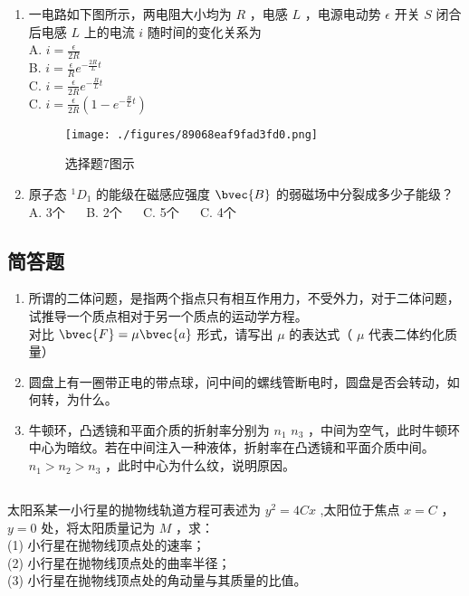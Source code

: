 \begin{enumerate}
\item 一电路如下图所示，两电阻大小均为 $R$ ，电感 $L$ ，电源电动势 $\epsilon$ 开关 $S$ 闭合后电感 $L$ 上的电流 $i$ 随时间的变化关系为\\

A. $i = \frac{\epsilon}{2R}$\\
B. $i = \frac{\epsilon}{R}e^{-\frac{2R}{L}t}$\\
C. $i = \frac{\epsilon}{2R}e^{-\frac{R}{L}t}$\\
C. $i = \frac{\epsilon}{2R}(1-e^{-\frac{R}{L}t})$\\
\begin{figure}[ht]
\centering
\texttt{[image: ./figures/89068eaf9fad3fd0.png]}
\caption{选择题7图示} \label{fig_CAS18_2}
\end{figure}
\item 原子态 $^{1}D_{1}$ 的能级在磁感应强度 $\bvec{B}$ 的弱磁场中分裂成多少子能级？\\

A. 3个 $\quad$
B. 2个 $\quad$
C. 5个 $\quad$
C. 4个 $\quad$
\end{enumerate}

\subsection{简答题}

\begin{enumerate}

\item 所谓的二体问题，是指两个指点只有相互作用力，不受外力，对于二体问题，试推导一个质点相对于另一个质点的运动学方程。\\
对比 $\bvec{F} = \mu \bvec{a}$ 形式，请写出 $\mu$ 的表达式（ $\mu$ 代表二体约化质量）

\item 圆盘上有一圈带正电的带点球，问中间的螺线管断电时，圆盘是否会转动，如何转，为什么。

\item 牛顿环，凸透镜和平面介质的折射率分别为 $n_{1}$ $n_{3}$ ，中间为空气，此时牛顿环中心为暗纹。若在中间注入一种液体，折射率在凸透镜和平面介质中间。$n_{1}>n_{2}>n_{3}$ ，此时中心为什么纹，说明原因。

\end{enumerate}

\subsection{ }
太阳系某一小行星的抛物线轨道方程可表述为 $y^{2} = 4Cx$ ,太阳位于焦点 $x = C$ ，$y = 0$ 处，将太阳质量记为 $M$ ，求：\\
(1) 小行星在抛物线顶点处的速率；\\
(2) 小行星在抛物线顶点处的曲率半径；\\
(3) 小行星在抛物线顶点处的角动量与其质量的比值。\\

